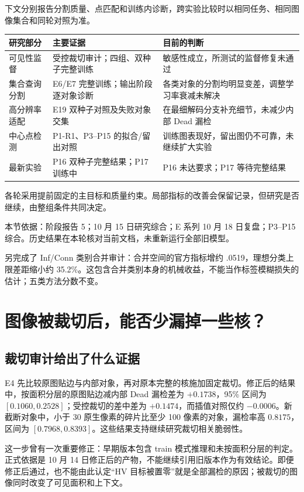 \documentclass[UTF8,zihao=-4,fontset=windows]{ctexart}
\newcommand{\src}[1]{\par{\footnotesize\color{gray}本节依据：#1}\par}
\begin{document}
下文分别报告分割质量、点匹配和训练内诊断，跨实验比较时以相同任务、相同图像集合和同轮对照为准。

\begin{table}[H]\centering\small
\begin{tabularx}{\linewidth}{p{24mm}XX}\toprule
研究部分 & 主要证据 & 目前的判断\\\midrule
可见性监督 & 受控裁切审计；四组、双种子完整训练 & 敏感性成立，所测试的监督修复未通过\\
集合查询分割 & E6/E7 完整训练；输出阶段逐对象诊断 & 各类对象的分割均明显变差，调整学习率衰减未解决\\
高分辨率适配 & E19 双种子对照及失败对象交集 & 在最细解码分支补充细节，未减少内部 Dead 漏检\\
中心点检测 & P1-R1、P3--P15 的拟合/留出对照 & 训练图表现好，留出图仍不可靠，未继续扩大实验\\
最新实验 & P16 双种子完整结果；P17 训练中 & P16 未达要求；P17 等待完整结果\\\bottomrule
\end{tabularx}
\end{table}

各轮采用提前固定的主目标和质量约束。局部指标的改善会保留记录，但研究是否继续，由整组条件共同决定。

\src{阶段报告 5；10 月 15 日研究综合；E 系列 10 月 18 日复盘；P3--P15 综合。历史结果在本轮核对当前文档，未重新运行全部旧模型。}

另完成了 Inf/Conn 类别合并审计：合并空间的官方指标增约 .0519，理想分类上限差距缩小约 35.2\%。这包含合并类别本身的机械收益，不能当作标签模糊损失的估计；五类方法分数不变。

\section{图像被裁切后，能否少漏掉一些核？}

\subsection{裁切审计给出了什么证据}

E4 先比较原图贴边与内部对象，再对原本完整的核施加固定裁切。修正后的结果中，按面积分层的原图贴边减内部 Dead 漏检差为 $+0.1738$，95\% 区间为 $[0.1060,0.2528]$；受控裁切的差中差为 $+0.1474$，而插值对照仅约 $-0.0006$。新截断对象中，小于 30 原生像素的碎片比至少 100 像素的对象，漏检率高 $0.8175$，区间为 $[0.7968,0.8393]$。这些结果支持继续研究裁切相关脆弱性。

这一步曾有一次重要修正：早期版本包含 train 模式推理和未按面积分层的判定。正式依据是 10 月 14 日修正后的产物，不能继续引用旧版本作为有效结论。即便修正后通过，也不能由此认定“HV 目标被置零”就是全部漏检的原因；被裁切的图像同时改变了可见面积和上下文。
\end{document}
